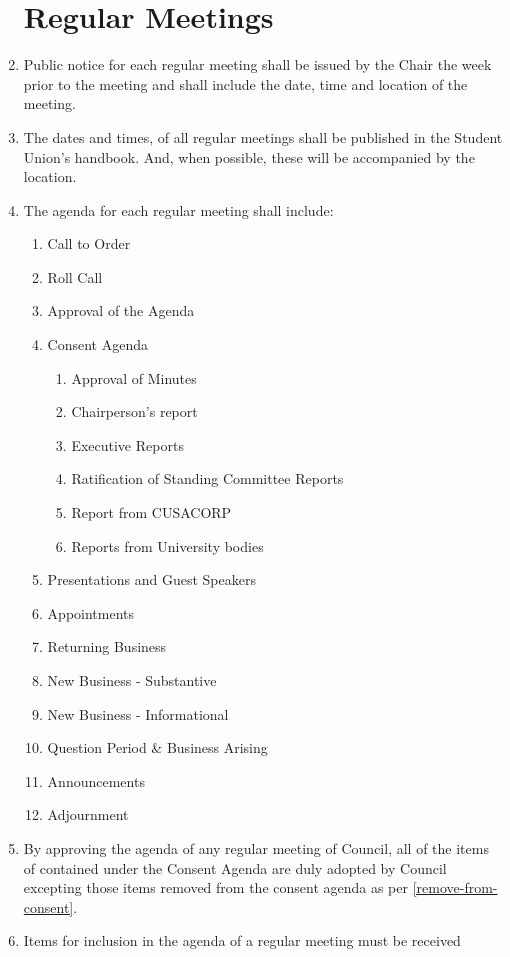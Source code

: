 \documentclass[oneside]{book}
\begin{document}
\begin{enumerate}
\section{\label{Regular_Meetings}Regular Meetings }

\item Public notice for each regular meeting shall be issued by the Chair
the week prior to the meeting and shall include the date, time and
location of the meeting. 
\item The dates and times, of all regular meetings shall be published in
the Student Union's handbook. And, when possible, these will be accompanied by the location.
\item The agenda for each regular meeting shall include: 

\begin{enumerate}
\item Call to Order 
\item Roll Call
\item Approval of the Agenda
\item Consent Agenda 
\begin{enumerate}
\item Approval of Minutes 
\item Chairperson's report
\item Executive Reports 
\item Ratification of Standing Committee Reports
\item Report from CUSACORP 
\item Reports from University bodies
\end{enumerate}
\item Presentations and Guest Speakers 
\item Appointments
\item Returning Business
\item New Business - Substantive
\item New Business - Informational
\item Question Period \& Business Arising
\item Announcements 
\item Adjournment 
\end{enumerate}
\item By approving the agenda of any regular meeting of Council, all of the 
items of contained under the Consent Agenda are duly adopted by Council excepting 
those items removed from the consent agenda as per \autoref{remove-from-consent}.
\item Items for inclusion in the agenda of a regular meeting must be received

\end{enumerate}
\end{document}
